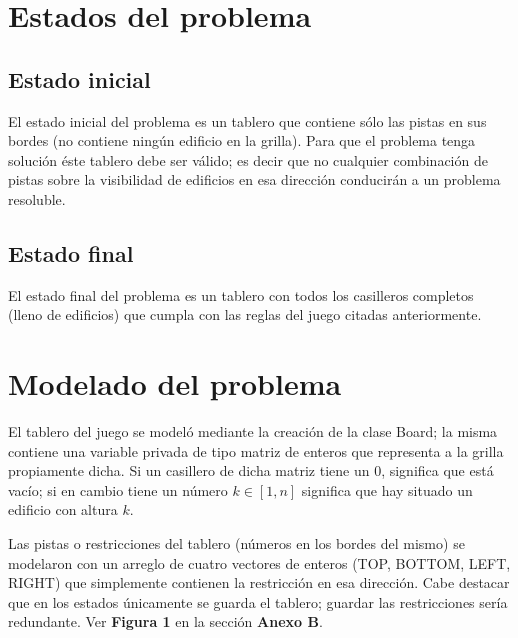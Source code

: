 \documentclass[%
    final,
    reprint,
    notitlepage,
    narroweqnarray,
    inline,
    twoside,
    invited
    ]{ieee}
\begin{document}


\section{Estados del problema}

\subsection{Estado inicial}

\par El estado inicial del problema es un tablero que contiene sólo las pistas en sus bordes (no contiene ningún edificio en la grilla). Para que el problema tenga solución éste tablero debe ser válido; es decir que no cualquier combinación de pistas sobre la visibilidad de edificios en esa dirección conducirán a un problema resoluble.

\subsection{Estado final}

\par El estado final del problema es un tablero con todos los casilleros completos (lleno de edificios) que cumpla con las reglas del juego citadas anteriormente.

\section{Modelado del problema}

\par El tablero del juego se modeló mediante la creación de la clase Board; la misma contiene una variable privada de tipo matriz de enteros que representa a la grilla propiamente dicha. Si un casillero de dicha matriz  tiene un $0$, significa que  está vacío; si en cambio tiene un número $k \in [1,n]$ significa que hay situado un edificio con altura $k$.\\
\par Las pistas o restricciones del tablero (números en los bordes del mismo) se modelaron con un arreglo de cuatro vectores de enteros (TOP, BOTTOM, LEFT, RIGHT) que simplemente contienen la restricción en esa dirección.
Cabe destacar que en los estados únicamente se guarda el tablero; guardar las restricciones sería redundante. Ver \textbf{Figura 1} en la sección \textbf{Anexo B}.\\
\end{document}

